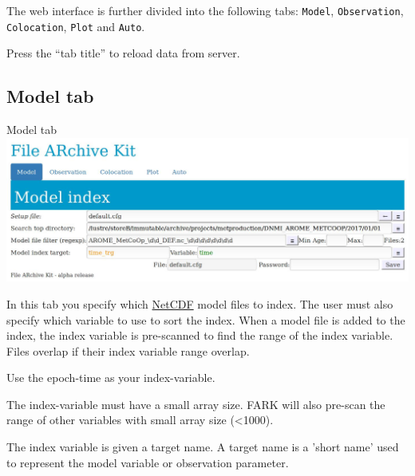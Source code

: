 \documentclass[letterpaper,10pt,twoside,twocolumn,openany]{book}
\begin{document}
The web interface is further divided into the following tabs: \lstinline!Model!, \lstinline!Observation!, \lstinline!Colocation!, 
\lstinline!Plot! and \lstinline!Auto!.

\begin{quotebox}
Press the ``tab title'' to reload data from server.
\end{quotebox}

\subsection{Model tab}

\begin{paperbox}{Model tab}
  \includegraphics[width=\columnwidth]{fark_model.jpg}
\end{paperbox}
In this tab you specify which \hyperlink{netcdf}{NetCDF} model files to index.
The user must also specify which variable to use to sort the index.
When a model file is added to the index, the index variable is pre-scanned to 
find the range of the index variable. 
Files overlap if their index variable range overlap.
\begin{quotebox}
Use the epoch-time as your index-variable.
\end{quotebox}
The index-variable must have a small array size. 
FARK will also pre-scan the range of other variables with small array size (<1000).

The index variable is given a target name.
A target name is a 'short name' used to
represent the model variable or observation 
parameter.
\end{document}
